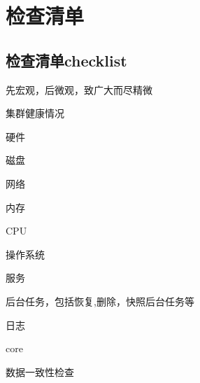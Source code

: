 \chapter{检查清单}

\section{检查清单checklist}

先宏观，后微观，致广大而尽精微

\begin{compactenum}
\item 集群健康情况
\item 硬件
    \begin{compactenum}
    \item 磁盘
    \item 网络
    \item 内存
    \item CPU
    \item 操作系统
    \end{compactenum}
\item 服务
    \begin{compactenum}
    \item 后台任务，包括恢复,删除，快照后台任务等
    \item 日志
    \item core
    \end{compactenum}
\item 数据一致性检查
\end{compactenum}
